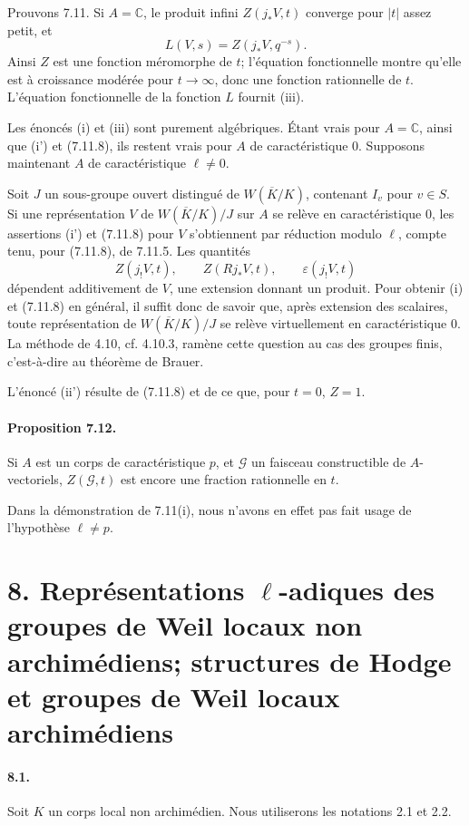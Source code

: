 \documentclass[10pt]{article}
\newcommand{\C}{\mathbb C}
\begin{document}
Prouvons 7.11. Si \(A=\C\), le produit infini \(Z(j_*V,t)\) converge pour \(|t|\) assez petit, et
\[
L(V,s)=Z(j_*V,q^{-s}).
\]
Ainsi \(Z\) est une fonction méromorphe de \(t\); l'équation fonctionnelle montre qu'elle est à croissance modérée pour \(t\to\infty\), donc une fonction rationnelle de \(t\). L'équation fonctionnelle de la fonction \(L\) fournit (iii).

Les énoncés (i) et (iii) sont purement algébriques. Étant vrais pour \(A=\C\), ainsi que (i') et (7.11.8), ils restent vrais pour \(A\) de caractéristique \(0\). Supposons maintenant \(A\) de caractéristique \(\ell\ne0\).

Soit \(J\) un sous-groupe ouvert distingué de \(W(\overline K/K)\), contenant \(I_v\) pour \(v\in S\). Si une représentation \(V\) de \(W(\overline K/K)/J\) sur \(A\) se relève en caractéristique \(0\), les assertions (i') et (7.11.8) pour \(V\) s'obtiennent par réduction modulo \(\ell\), compte tenu, pour (7.11.8), de 7.11.5. Les quantités
\[
Z(j_!V,t),\qquad Z(Rj_*V,t),\qquad \varepsilon(j_!V,t)
\]
dépendent additivement de \(V\), une extension donnant un produit. Pour obtenir (i) et (7.11.8) en général, il suffit donc de savoir que, après extension des scalaires, toute représentation de \(W(\overline K/K)/J\) se relève virtuellement en caractéristique \(0\). La méthode de 4.10, cf. 4.10.3, ramène cette question au cas des groupes finis, c'est-à-dire au théorème de Brauer.

L'énoncé (ii') résulte de (7.11.8) et de ce que, pour \(t=0\), \(Z=1\).

\paragraph{Proposition 7.12.} Si \(A\) est un corps de caractéristique \(p\), et \(\mathcal G\) un faisceau constructible de \(A\)-vectoriels, \(Z(\mathcal G,t)\) est encore une fraction rationnelle en \(t\).

Dans la démonstration de 7.11(i), nous n'avons en effet pas fait usage de l'hypothèse \(\ell\ne p\).

\section*{8. Représentations \(\ell\)-adiques des groupes de Weil locaux non archimédiens; structures de Hodge et groupes de Weil locaux archimédiens}

\paragraph{8.1.} Soit \(K\) un corps local non archimédien. Nous utiliserons les notations 2.1 et 2.2.
\end{document}
